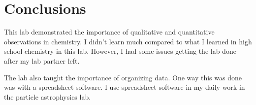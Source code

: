 \documentclass[11pt, letterpaper]{article}
\begin{document}
\section{Conclusions}

This lab demonstrated the importance of qualitative and quantitative observations in chemistry.
I didn't learn much compared to what I learned in high school chemistry in this lab.
However, I had some issues getting the lab done after my lab partner left.


The lab also taught the importance of organizing data. 
One way this was done was with a spreadsheet software.
I use spreadsheet software in my daily work in the particle astrophysics lab.
\end{document}
